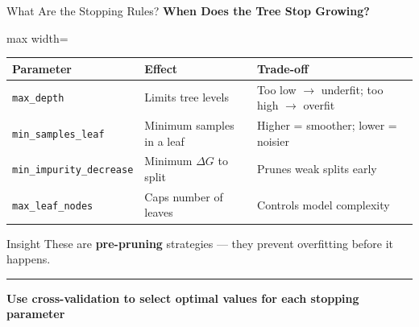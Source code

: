 \documentclass[8pt,aspectratio=169]{beamer}
\newcommand{\bottomnote}[1]{%
\vfill
\vspace{-2mm}
\textcolor{mllavender2}{\rule{\textwidth}{0.4pt}}
\vspace{1mm}
\footnotesize
\textbf{#1}
}
\newcommand{\highlight}[1]{\textcolor{mlorange}{\textbf{#1}}}
\begin{document}
\begin{frame}[t]{What Are the Stopping Rules?}
\small
\textbf{When Does the Tree Stop Growing?}

\vspace{2mm}
\footnotesize
\begin{adjustbox}{max width=\textwidth}
\begin{tabular}{lp{5cm}p{5cm}}
\toprule
\textbf{Parameter} & \textbf{Effect} & \textbf{Trade-off} \\
\midrule
\texttt{max\_depth} & Limits tree levels & \footnotesize Too low $\to$ underfit; too high $\to$ overfit \\
\rowcolor{mllavender4}
\texttt{min\_samples\_leaf} & Minimum samples in a leaf & \footnotesize Higher = smoother; lower = noisier \\
\texttt{min\_impurity\_decrease} & Minimum $\Delta G$ to split & \footnotesize Prunes weak splits early \\
\rowcolor{mllavender4}
\texttt{max\_leaf\_nodes} & Caps number of leaves & \footnotesize Controls model complexity \\
\bottomrule
\end{tabular}
\end{adjustbox}

\vspace{3mm}
\begin{block}{Insight}
\footnotesize These are \highlight{pre-pruning} strategies --- they prevent overfitting before it happens.
\end{block}
\bottomnote{Use cross-validation to select optimal values for each stopping parameter}
\end{frame}

\end{document}
